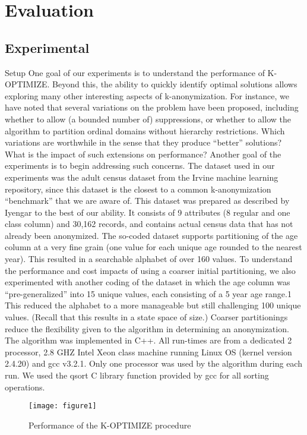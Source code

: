 \documentclass[]{seismica}
\begin{document}
   \section{Evaluation}
       \subsection{Experimental}
       Setup One goal of our experiments is to understand the performance of K-OPTIMIZE. Beyond this, the ability to quickly identify optimal solutions allows exploring many other interesting aspects of k-anonymization. For instance, we have noted that several variations on the problem have been proposed, including whether to allow (a bounded number of) suppressions, or whether to allow the algorithm to partition ordinal domains without hierarchy restrictions. Which variations are worthwhile in the sense that they produce “better” solutions? What is the impact of such extensions on performance? Another goal of the experiments is to begin addressing such concerns. The dataset used in our experiments was the adult census dataset from the Irvine machine learning repository, since this dataset is the closest to a common k-anonymization “benchmark” that we are aware of. This dataset was prepared as described by Iyengar to the best of our ability. It consists of 9 attributes (8 regular and one class column) and 30,162 records, and contains actual census data that has not already been anonymized. The so-coded dataset  supports partitioning of the age column at a very fine grain (one value for each unique age rounded to the nearest year). This resulted in a searchable alphabet of over 160 values. To understand the performance and cost impacts of using a coarser initial partitioning, we also experimented with another coding of the dataset in which the age column was “pre-generalized” into 15 unique values, each consisting of a 5 year age range.1 This reduced the alphabet to a more manageable but still challenging 100 unique values. (Recall that this results in a state space of size.) Coarser partitionings reduce the flexibility given to the algorithm in determining an anonymization. The algorithm was implemented in C++. All run-times are from a dedicated 2 processor, 2.8 GHZ Intel Xeon class machine running Linux OS (kernel version 2.4.20) and gcc v3.2.1. Only one processor was used by the algorithm during each run. We used the qsort C library function provided by gcc for all sorting operations.

    \begin{figure}[ht!]
       \texttt{[image: figure1]}
       \caption{Performance of the K-OPTIMIZE procedure}
       \label{fig:3}
    \end{figure}
\end{document}
